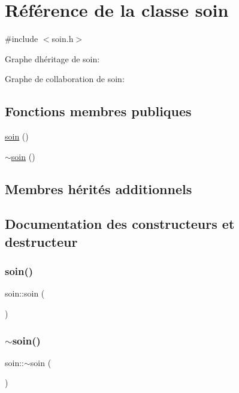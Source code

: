 \hypertarget{classsoin}{}\section{Référence de la classe soin}
\label{classsoin}


{\ttfamily \#include $<$soin.\+h$>$}



Graphe d\textquotesingle{}héritage de soin\+:


Graphe de collaboration de soin\+:
\subsection*{Fonctions membres publiques}
\begin{DoxyCompactItemize}
\item 
\hyperlink{classsoin_a54e92d61aa62de83fbc355474ef7bfd3}{soin} ()
\item 
\hyperlink{classsoin_a8609d150a97e6659cbfd864e72ab7307}{$\sim$soin} ()
\end{DoxyCompactItemize}
\subsection*{Membres hérités additionnels}


\subsection{Documentation des constructeurs et destructeur}
\mbox{\label{classsoin_a54e92d61aa62de83fbc355474ef7bfd3}} 
\subsubsection{\texorpdfstring{soin()}{soin()}}
{\footnotesize\ttfamily soin\+::soin (\begin{DoxyParamCaption}{ }\end{DoxyParamCaption})}

\mbox{\label{classsoin_a8609d150a97e6659cbfd864e72ab7307}} 
\subsubsection{\texorpdfstring{$\sim$soin()}{~soin()}}
{\footnotesize\ttfamily soin\+::$\sim$soin (\begin{DoxyParamCaption}{ }\end{DoxyParamCaption})}



